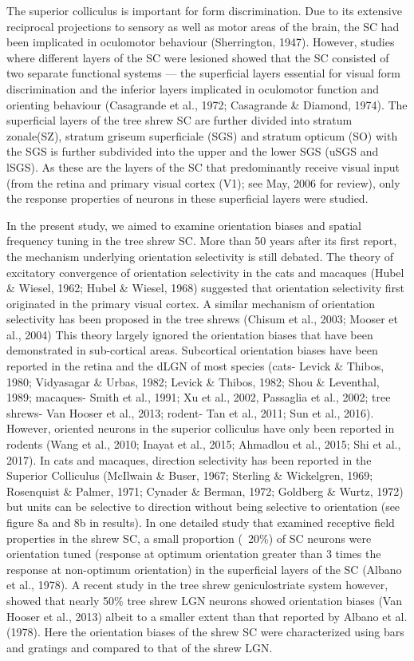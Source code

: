 	The superior colliculus is important for form discrimination. Due to its extensive reciprocal projections to sensory as well as motor areas of the brain, the SC had been implicated in oculomotor behaviour (Sherrington, 1947). However, studies where different layers of the SC were lesioned showed that the SC consisted of two separate functional systems --- the superficial layers essential for visual form discrimination and the inferior layers implicated in oculomotor function and orienting behaviour (Casagrande et al., 1972; Casagrande \& Diamond, 1974). The superficial layers of the tree shrew SC are further divided into stratum zonale(SZ), stratum griseum superficiale (SGS) and stratum opticum (SO) with the SGS is further subdivided into the upper and the lower SGS (uSGS and lSGS). As these are the layers of the SC that predominantly receive visual input (from the retina and primary visual cortex (V1); see May, 2006 for review), only the response properties of neurons in these superficial layers were studied.
	
	In the present study, we aimed to examine orientation biases and spatial frequency tuning in the tree shrew SC. More than 50 years after its first report, the mechanism underlying orientation selectivity is still debated. The theory of excitatory convergence of orientation selectivity in the cats and macaques (Hubel \& Wiesel, 1962; Hubel \& Wiesel, 1968) suggested that orientation selectivity first originated in the primary visual cortex. A similar mechanism of orientation selectivity has been proposed in the tree shrews (Chisum et al., 2003; Mooser et al., 2004) This theory largely ignored the orientation biases that have been demonstrated in sub-cortical areas. Subcortical orientation biases have been reported in the retina and the dLGN of most species (cats- Levick \& Thibos, 1980; Vidyasagar \& Urbas, 1982; Levick \& Thibos, 1982; Shou \& Leventhal, 1989; macaques- Smith et al., 1991; Xu et al., 2002, Passaglia et al., 2002; tree shrews- Van Hooser et al., 2013; rodent- Tan et al., 2011; Sun et al., 2016). However, oriented neurons in the superior colliculus have only been reported in rodents (Wang et al., 2010; Inayat et al., 2015; Ahmadlou et al., 2015; Shi et al., 2017). In cats and macaques, direction selectivity has been reported in the Superior Colliculus (McIlwain \& Buser, 1967; Sterling \& Wickelgren, 1969; Rosenquist \& Palmer, 1971; Cynader \& Berman, 1972; Goldberg \& Wurtz, 1972) but units can be selective to direction without being selective to orientation (see figure 8a and 8b in results). In one detailed study that examined receptive field properties in the shrew SC, a small proportion (~20\%) of SC neurons were orientation tuned (response at optimum orientation greater than 3 times the response at non-optimum orientation) in the superficial layers of the SC (Albano et al., 1978). A recent study in the tree shrew geniculostriate system however, showed that nearly 50\% tree shrew LGN neurons showed orientation biases (Van Hooser et al., 2013) albeit to a smaller extent than that reported by Albano et al. (1978). Here the orientation biases of the shrew SC were characterized using bars and gratings and compared to that of the shrew LGN.
	
